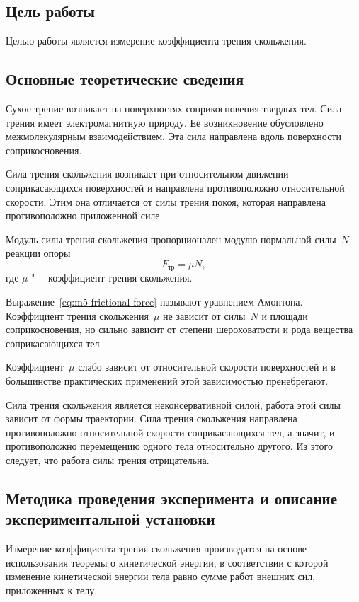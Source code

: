 \documentclass[a4paper, 12pt]{extarticle}
\begin{document}
\MTDTitlePage
\MTDInfoPage

\setcounter{section}{5}

\subsection{Цель работы}
Целью работы является измерение коэффициента трения скольжения. 

\subsection{Основные теоретические сведения}
Сухое трение возникает на поверхностях соприкосновения твердых тел. Сила трения имеет электромагнитную природу. Ее возникновение обусловлено межмолекулярным взаимодействием. Эта сила направлена вдоль поверхности соприкосновения. 

Сила трения скольжения возникает при относительном движении соприкасающихся поверхностей и направлена противоположно относительной скорости. Этим она отличается от силы трения покоя, которая направлена противоположно приложенной силе. 

Модуль силы трения скольжения пропорционален модулю нормальной силы~$N$ реакции опоры 
\begin{equation}
\label{eq:m5-frictional-force}
F_\text{тр} = \mu N,
\end{equation}
где $\mu$ "--- коэффициент трения скольжения. 

Выражение~\eqref{eq:m5-frictional-force} называют уравнением Амонтона. Коэффициент трения скольжения~$\mu$ не зависит от силы~$N$ и площади соприкосновения, но сильно зависит от степени шероховатости и рода вещества соприкасающихся тел.

Коэффициент~$\mu$ слабо зависит от относительной скорости поверхностей и в большинстве практических применений  этой зависимостью пренебрегают. 

Сила трения скольжения является неконсервативной силой, работа этой  силы зависит от формы траектории. Сила трения скольжения направлена противоположно относительной скорости соприкасающихся тел, а значит, и противоположно перемещению одного тела относительно другого. Из  этого следует, что работа силы трения отрицательна. 

\subsection{Методика проведения эксперимента и описание экспериментальной установки}
Измерение коэффициента трения скольжения производится на основе использования теоремы о кинетической энергии, в соответствии с которой изменение кинетической энергии тела равно сумме работ внешних сил, приложенных к телу. 
\end{document}
